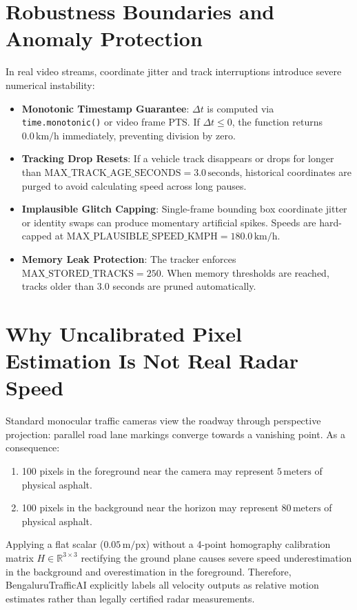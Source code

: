 \section{Robustness Boundaries and Anomaly Protection}
In real video streams, coordinate jitter and track interruptions introduce severe numerical instability:
\begin{itemize}[leftmargin=*]
    \item \textbf{Monotonic Timestamp Guarantee}: $\Delta t$ is computed via \texttt{time.monotonic()} or video frame PTS. If $\Delta t \le 0$, the function returns $0.0\,\text{km/h}$ immediately, preventing division by zero.
    \item \textbf{Tracking Drop Resets}: If a vehicle track disappears or drops for longer than $\text{MAX\_TRACK\_AGE\_SECONDS} = 3.0\,\text{seconds}$, historical coordinates are purged to avoid calculating speed across long pauses.
    \item \textbf{Implausible Glitch Capping}: Single-frame bounding box coordinate jitter or identity swaps can produce momentary artificial spikes. Speeds are hard-capped at $\text{MAX\_PLAUSIBLE\_SPEED\_KMPH} = 180.0\,\text{km/h}$.
    \item \textbf{Memory Leak Protection}: The tracker enforces $\text{MAX\_STORED\_TRACKS} = 250$. When memory thresholds are reached, tracks older than 3.0 seconds are pruned automatically.
\end{itemize}

\section{Why Uncalibrated Pixel Estimation Is Not Real Radar Speed}
\begin{limitationbox}
Standard monocular traffic cameras view the roadway through perspective projection: parallel road lane markings converge towards a vanishing point. As a consequence:
\begin{enumerate}
    \item 100 pixels in the foreground near the camera may represent $5\,\text{meters}$ of physical asphalt.
    \item 100 pixels in the background near the horizon may represent $80\,\text{meters}$ of physical asphalt.
\end{enumerate}
Applying a flat scalar ($0.05\,\text{m/px}$) without a 4-point homography calibration matrix $H \in \mathbb{R}^{3 \times 3}$ rectifying the ground plane causes severe speed underestimation in the background and overestimation in the foreground. Therefore, BengaluruTrafficAI explicitly labels all velocity outputs as relative motion estimates rather than legally certified radar measurements.
\end{limitationbox}
